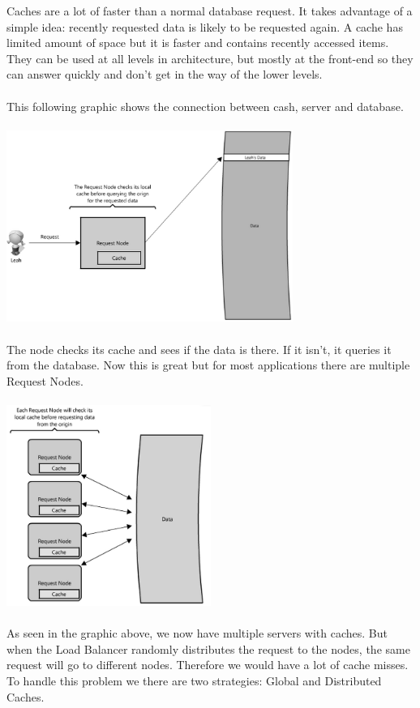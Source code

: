 \documentclass[12p]{article}
\begin{document}
	Caches are a lot of faster than a normal database request. It takes advantage of a simple idea: recently requested data is likely to be requested again. A cache has limited amount of space but it is faster and contains recently accessed items. They can be used at all levels in architecture, but mostly at the front-end so they can answer quickly and don't get in the way of the lower levels. \\\\
	This following graphic shows the connection between cash, server and database. \\\\
	\includegraphics[width=0.7\textwidth]{img/cache1} \cite{cache} \\\\
	The node checks its cache and sees if the data is there. If it isn't, it queries it from the database. Now this is great but for most applications there are multiple Request Nodes. \\\\
	\includegraphics[width=0.5\textwidth]{img/cache2} \cite{cache} \\\\
	As seen in the graphic above, we now have multiple servers with caches. But when the Load Balancer randomly distributes the request to the nodes, the same request will go to different nodes. Therefore we would have a lot of cache misses. To handle this problem we there are two strategies: Global and Distributed Caches. 
	
\end{document}
